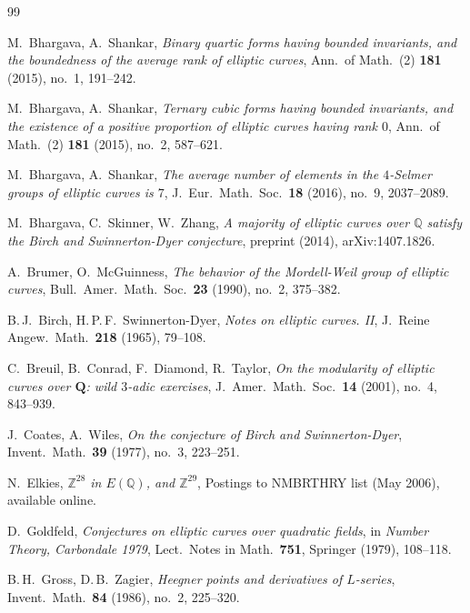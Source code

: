 \documentclass[12pt,a4paper]{amsart}
\theoremstyle{definition}
\theoremstyle{remark}
\begin{document}
\begin{thebibliography}{99}

M.\ Bhargava, A.\ Shankar,
\textit{Binary quartic forms having bounded invariants, and the boundedness
of the average rank of elliptic curves},
Ann.\ of Math.\ (2) \textbf{181} (2015), no.\ 1, 191--242.

M.\ Bhargava, A.\ Shankar,
\textit{Ternary cubic forms having bounded invariants, and the existence of a
positive proportion of elliptic curves having rank $0$},
Ann.\ of Math.\ (2) \textbf{181} (2015), no.\ 2, 587--621.

M.\ Bhargava, A.\ Shankar,
\textit{The average number of elements in the $4$-Selmer groups of elliptic curves is $7$},
J.\ Eur.\ Math.\ Soc.\ \textbf{18} (2016), no.\ 9, 2037--2089.

M.\ Bhargava, C.\ Skinner, W.\ Zhang,
\textit{A majority of elliptic curves over $\mathbb{Q}$ satisfy the Birch and
Swinnerton-Dyer conjecture},
preprint (2014), arXiv:1407.1826.

A.\ Brumer, O.\ McGuinness,
\textit{The behavior of the Mordell-Weil group of elliptic curves},
Bull.\ Amer.\ Math.\ Soc.\ \textbf{23} (1990), no.\ 2, 375--382.

B.\,J.\ Birch, H.\,P.\,F.\ Swinnerton-Dyer,
\textit{Notes on elliptic curves. II},
J.\ Reine Angew.\ Math.\ \textbf{218} (1965), 79--108.

C.\ Breuil, B.\ Conrad, F.\ Diamond, R.\ Taylor,
\textit{On the modularity of elliptic curves over $\mathbf{Q}$: wild $3$-adic exercises},
J.\ Amer.\ Math.\ Soc.\ \textbf{14} (2001), no.\ 4, 843--939.

J.\ Coates, A.\ Wiles,
\textit{On the conjecture of Birch and Swinnerton-Dyer},
Invent.\ Math.\ \textbf{39} (1977), no.\ 3, 223--251.

N.\ Elkies,
\textit{$\mathbb{Z}^{28}$ in $E(\mathbb{Q})$, and $\mathbb{Z}^{29}$},
Postings to NMBRTHRY list (May 2006), available online.

D.\ Goldfeld,
\textit{Conjectures on elliptic curves over quadratic fields},
in \textit{Number Theory, Carbondale 1979}, Lect.\ Notes in Math.\ \textbf{751},
Springer (1979), 108--118.

B.\,H.\ Gross, D.\,B.\ Zagier,
\textit{Heegner points and derivatives of $L$-series},
Invent.\ Math.\ \textbf{84} (1986), no.\ 2, 225--320.


\end{thebibliography}
\end{document}
